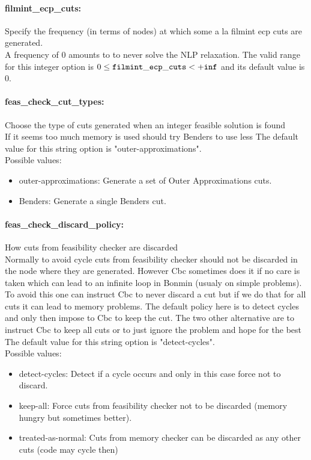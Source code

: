\paragraph{filmint\_ecp\_cuts:}\label{sec:filmint_ecp_cuts} Specify the frequency (in terms of nodes) at which some a la filmint ecp cuts are generated. $\;$ \\
 A frequency of 0 amounts to to never solve the
NLP relaxation. The valid range for this integer option is
$0 \le {\tt filmint\_ecp\_cuts } <  {\tt +inf}$
and its default value is $0$.


\paragraph{feas\_check\_cut\_types:}\label{sec:feas_check_cut_types} Choose the type of cuts generated when an integer feasible solution is found $\;$ \\
 If it seems too much memory is used should try
Benders to use less
The default value for this string option is "outer-approximations".
\\ 
Possible values:
\begin{itemize}
   \item outer-approximations: Generate a set of Outer Approximations cuts.
   \item Benders: Generate a single Benders cut.
\end{itemize}

\paragraph{feas\_check\_discard\_policy:}\label{sec:feas_check_discard_policy} How cuts from feasibility checker are discarded $\;$ \\
 Normally to avoid cycle cuts from feasibility
checker should not be discarded in the node where
they are generated. However Cbc sometimes does it
if no care is taken which can lead to an infinite
loop in Bonmin (usualy on simple problems). To
avoid this one can instruct Cbc to never discard
a cut but if we do that for all cuts it can lead
to memory problems. The default policy here is to
detect cycles and only then impose to Cbc to keep
the cut. The two other alternative are to
instruct Cbc to keep all cuts or to just ignore
the problem and hope for the best
The default value for this string option is "detect-cycles".
\\ 
Possible values:
\begin{itemize}
   \item detect-cycles: Detect if a cycle occurs and only in this case
force not to discard.
   \item keep-all: Force cuts from feasibility checker not to be
discarded (memory hungry but sometimes better).
   \item treated-as-normal: Cuts from memory checker can be discarded as
any other cuts (code may cycle then)
\end{itemize}

